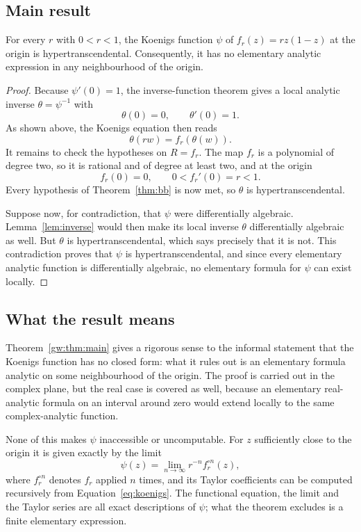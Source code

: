 \subsection{Main result}

\begin{theorem}\label{gw:thm:main}
For every $r$ with $0<r<1$, the Koenigs function $\psi$ of $f_r(z)=rz(1-z)$ at the origin is hypertranscendental. Consequently, it has no elementary analytic expression in any neighbourhood of the origin.
\end{theorem}

\begin{proof}
Because $\psi'(0)=1$, the inverse-function theorem gives a local analytic inverse $\theta=\psi^{-1}$ with
\[
 \theta(0)=0,
 \qquad
 \theta'(0)=1.
\]
As shown above, the Koenigs equation then reads
\[
 \theta(rw)=f_r(\theta(w)).
\]
It remains to check the hypotheses on $R=f_r$. The map $f_r$ is a polynomial of degree two, so it is rational and of degree at least two, and at the origin
\[
 f_r(0)=0,
 \qquad
 0<f_r'(0)=r<1.
\]
Every hypothesis of Theorem~\ref{thm:bb} is now met, so $\theta$ is hypertranscendental.

Suppose now, for contradiction, that $\psi$ were differentially algebraic. Lemma~\ref{lem:inverse} would then make its local inverse $\theta$ differentially algebraic as well. But $\theta$ is hypertranscendental, which says precisely that it is not. This contradiction proves that $\psi$ is hypertranscendental, and since every elementary analytic function is differentially algebraic, no elementary formula for $\psi$ can exist locally.
\end{proof}

\subsection{What the result means}

Theorem~\ref{gw:thm:main} gives a rigorous sense to the informal statement that the Koenigs function has no closed form: what it rules out is an elementary formula analytic on some neighbourhood of the origin. The proof is carried out in the complex plane, but the real case is covered as well, because an elementary real-analytic formula on an interval around zero would extend locally to the same complex-analytic function.

None of this makes $\psi$ inaccessible or uncomputable. For $z$ sufficiently close to the origin it is given exactly by the limit
\begin{equation}\label{eq:limit}
 \psi(z)=\lim_{n\to\infty} r^{-n}f_r^{\circ n}(z),
\end{equation}
where $f_r^{\circ n}$ denotes $f_r$ applied $n$ times, and its Taylor coefficients can be computed recursively from Equation~\eqref{eq:koenigs}. The functional equation, the limit and the Taylor series are all exact descriptions of $\psi$; what the theorem excludes is a finite elementary expression.


